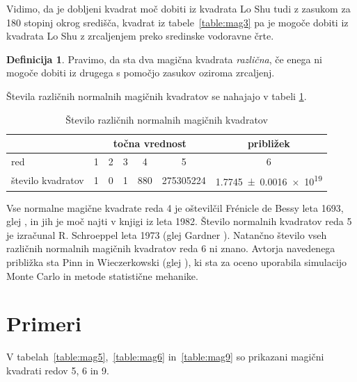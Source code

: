 \documentclass[a4paper,12pt]{article}
\newcommand{\pojem}[1]{\emph{\color{purple}#1}}
\theoremstyle{definition}
\newtheorem{definicija}{Definicija}
\theoremstyle{plain}
\begin{document}
Vidimo, da je dobljeni kvadrat moč dobiti iz kvadrata Lo Shu tudi z zasukom za
180 stopinj okrog središča, kvadrat iz tabele~\ref{table:mag3} pa je mogoče dobiti
iz kvadrata Lo Shu z zrcaljenjem preko sredinske vodoravne črte. %

\begin{definicija}
   Pravimo, da sta dva magična kvadrata \pojem{različna}, če enega ni mogoče dobiti
   iz drugega s pomočjo zasukov oziroma zrcaljenj.
\end{definicija}

Števila različnih normalnih magičnih kvadratov se nahajajo v tabeli \ref{table:stevila}.

\begin{table}[!ht]
   \centering
   \caption{Število različnih normalnih magičnih kvadratov}
   \label{table:stevila}
   \begin{tabular}{lcccccc}\toprule
      & \multicolumn{5}{c}{točna vrednost} & približek \\
      \midrule
      red & 1 & 2 & 3 & 4 & 5 & 6 \\
      število kvadratov & 1 & 0 & 1 & 880 & \num{275305224} & \num[separate-uncertainty]{1.7745 \pm 0.0016 e19} \\
      \bottomrule
   \end{tabular}
\end{table}

Vse normalne magične kvadrate reda 4 je oštevilčil Frénicle de Bessy
leta 1693, glej \cite{bessy}, in jih je moč najti v knjigi \cite{berlekamp}
iz leta 1982. Število normalnih kvadratov reda 5 je izračunal
R. Schroeppel leta 1973 (glej Gardner \cite{gardner}).
Natančno število vseh različnih normalnih magičnih kvadratov reda 6 ni znano.
Avtorja navedenega približka sta Pinn in Wieczerkowski (glej \cite{pinn}), ki
sta za oceno uporabila simulacijo Monte Carlo in metode statistične mehanike.


\section{Primeri}

V tabelah~\ref{table:mag5},~\ref{table:mag6} in~\ref{table:mag9} so prikazani
magični kvadrati redov 5, 6 in 9. %
\end{document}
